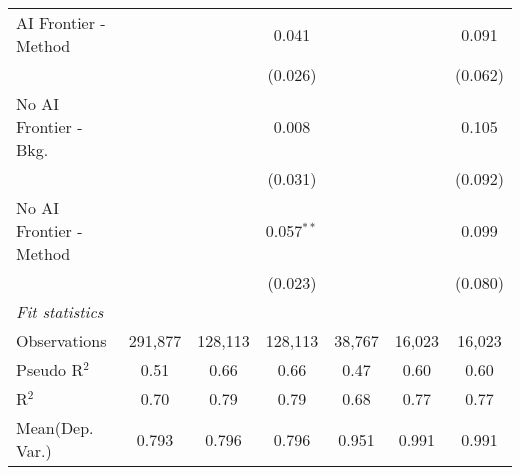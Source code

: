 \begin{tabular}{lcccccc}
   AI Frontier - Method    &              &             & 0.041         &               &               & 0.091\\   
                           &              &             & (0.026)       &               &               & (0.062)\\   
   No AI Frontier - Bkg.   &              &             & 0.008         &               &               & 0.105\\   
                           &              &             & (0.031)       &               &               & (0.092)\\   
   No AI Frontier - Method &              &             & 0.057$^{**}$  &               &               & 0.099\\   
                           &              &             & (0.023)       &               &               & (0.080)\\   
   \midrule
   \emph{Fit statistics}\\
   Observations            & 291,877      & 128,113     & 128,113       & 38,767        & 16,023        & 16,023\\  
   Pseudo R$^2$            & 0.51         & 0.66        & 0.66          & 0.47          & 0.60          & 0.60\\  
   R$^2$                   & 0.70         & 0.79        & 0.79          & 0.68          & 0.77          & 0.77\\  
Mean(Dep. Var.) & 0.793 & 0.796 & 0.796 & 0.951 & 0.991 & 0.991 \\
   

\end{tabular}
